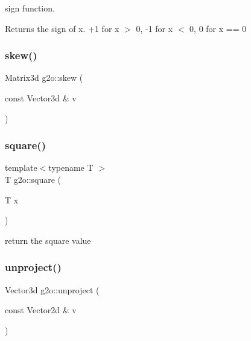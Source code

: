 sign function. \begin{DoxyReturn}{Returns}
the sign of x. +1 for x $>$ 0, -\/1 for x $<$ 0, 0 for x == 0 
\end{DoxyReturn}
\mbox{\label{namespaceg2o_adb3143a37b9bc002f4f7b6423061ef81}} 
\subsubsection{\texorpdfstring{skew()}{skew()}}
{\footnotesize\ttfamily Matrix3d g2o\+::skew (\begin{DoxyParamCaption}\item[{const Vector3d \&}]{v }\end{DoxyParamCaption})\hspace{0.3cm}{\ttfamily [inline]}}

\mbox{\label{namespaceg2o_ada3127f4fe72b228407fabe23b72a50b}} 
\subsubsection{\texorpdfstring{square()}{square()}}
{\footnotesize\ttfamily template$<$typename T $>$ \\
T g2o\+::square (\begin{DoxyParamCaption}\item[{T}]{x }\end{DoxyParamCaption})\hspace{0.3cm}{\ttfamily [inline]}}

return the square value \mbox{\label{namespaceg2o_ab8746174c3f8c25af4188fc24b2dc3d4}} 
\subsubsection{\texorpdfstring{unproject()}{unproject()}\hspace{0.1cm}{\footnotesize\ttfamily [1/2]}}
{\footnotesize\ttfamily Vector3d g2o\+::unproject (\begin{DoxyParamCaption}\item[{const Vector2d \&}]{v }\end{DoxyParamCaption})\hspace{0.3cm}{\ttfamily [inline]}}

